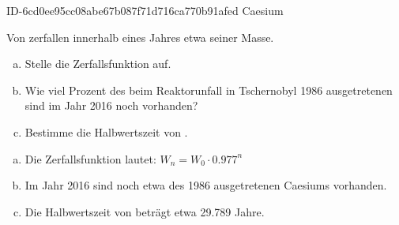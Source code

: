 \begin{exercise}
      {ID-6cd0ee95cc08abe67b087f71d716ca770b91afed}
      {Caesium}
  \ifproblem\problem\par
    Von  zerfallen innerhalb eines
    Jahres etwa  seiner Masse.
    \begin{enumerate}[a)]
      \item Stelle die Zerfallsfunktion auf.
      \item Wie viel Prozent des beim Reaktorunfall in
            Tschernobyl \num{1986} ausgetretenen 
            sind im Jahr \num{2016} noch vorhanden?
      \item Bestimme die Halbwertszeit von .
    \end{enumerate}
  \fi
  \ifoutcome\outcome\par
    \begin{enumerate}[a)]
      \item Die Zerfallsfunktion lautet: $W_{n}=W_{0}\cdot\num{0.977}^{n}$
      \item Im Jahr \num{2016} sind noch etwa  des
            \num{1986} ausgetretenen Caesiums vorhanden.
      \item Die Halbwertszeit von  beträgt etwa
            \num{29.789} Jahre.
    \end{enumerate}
  \fi
\end{exercise}
